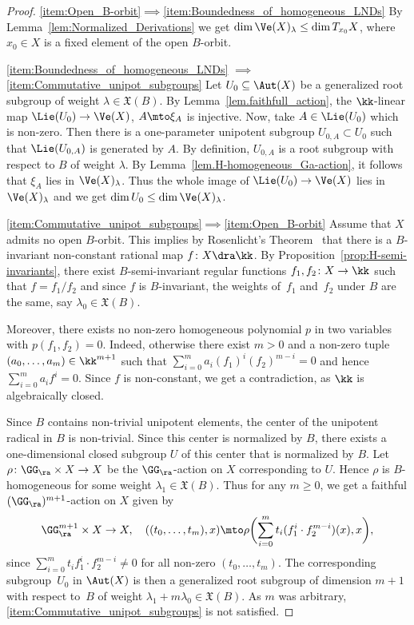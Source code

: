 \skpt
\begin{proof}
\eqref{item:Open_B-orbit}$\implies$\eqref{item:Boundedness_of_homogeneous_LNDs}
By Lemma~\ref{lem:Normalized_Derivations} we get
$\dim \Ve(X)_{\lambda} \leq \dim T_{x_0} X$, where $x_0 \in X$ is a fixed element
of the open $B$-orbit.

\eqref{item:Boundedness_of_homogeneous_LNDs}
$\implies$\eqref{item:Commutative_unipot_subgroups}
Let $U_0 \subseteq \Aut(X)$
be a generalized root subgroup of weight \hbox{$\lambda \in \mathfrak{X}(B)$}.
By Lemma~\ref{lem.faithfull_action}, the $\kk$-linear map
$\Lie(U_0) \to \Ve(X)$, $A \mto \xi_A$ is injective.
Now, take $A \in \Lie(U_0)$ which is non-zero. Then there is a one-parameter
unipotent subgroup $U_{0, A} \subset U_0$ such that $\Lie(U_{0, A})$ is generated by $A$.
By definition, $U_{0, A}$ is a root subgroup with respect to $B$ of weight $\lambda$.
By Lemma~\ref{lem.H-homogeneous_Ga-action}, it follows that $\xi_A$ lies in $\Ve(X)_{\lambda}$.
Thus the whole image of $\Lie(U_0) \to \Ve(X)$ lies in $\Ve(X)_\lambda$ and we get
$\dim U_0 \leq \dim \Ve(X)_\lambda$.

\eqref{item:Commutative_unipot_subgroups}$\implies$\eqref{item:Open_B-orbit}
Assume that $X$ admits no open $B$-orbit.
This implies by Rosenlicht's Theorem~\cite[Th.\,2]{Ro1956Some-basic-theorem}
that there is a $B$-invariant non-constant
rational map $f \colon X \dra \kk$.
By Proposition~\ref{prop:H-semi-invariants},
there exist $B$-semi-invariant regular functions $f_1, f_2 \colon X \to \kk$
such that $f = f_1 / f_2$ and since $f$ is $B$-invariant, the weights of~$f_1$ and~$f_2$ under $B$ are the same, say $\lambda_0 \in \mathfrak{X}(B)$.

Moreover, there exists no non-zero homogeneous
polynomial $p$ in two variables with $p(f_1, f_2) = 0$. Indeed, otherwise
there exist $m > 0$ and a non-zero tuple $(a_0, \ldots, a_m) \in \kk^{m+1}$ such that
$\sum_{i=0}^m a_i (f_1)^i (f_2)^{m-i} = 0$ and hence
$\sum_{i=0}^m a_i f^i = 0$. Since $f$ is non-constant, we get
a contradiction, as $\kk$ is algebraically closed.

Since $B$ contains non-trivial
unipotent elements, the center of the unipotent radical in $B$ is non-trivial.
Since this center is normalized by $B$, there exists a one-dimensional closed
subgroup $U$ of this center that is normalized by $B$.
Let $\rho \colon \GG_\ra \times X \to X$ be the $\GG_\ra$-action on $X$
corresponding to $U$.
Hence $\rho$ is $B$-homogeneous for some weight $\lambda_1 \in \mathfrak{X}(B)$.
Thus for any $m \geq 0$, we get a faithful $(\GG_\ra)^{m+1}$-action on $X$ given by
\[
\GG_\ra^{m+1} \times X \to X, \quad
((t_0, \ldots, t_m), x) \mto
\rho\biggl(\sum_{i=0}^m t_i (f_1^i \cdot f_2^{m-i})(x), x \biggr),
\]
since $\sum_{i=0}^m t_i f_1^i \cdot f_2^{m-i} \neq 0$ for all non-zero
$(t_0, \ldots, t_m)$.
The corresponding subgroup~$U_0$ in $\Aut(X)$ is then
a generalized root subgroup of dimension $m+1$
with respect to~$B$ of weight $\lambda_1 + m \lambda_0 \in \mathfrak{X}(B)$.
As $m$ was arbitrary, \eqref{item:Commutative_unipot_subgroups} is not satisfied.
\end{proof}

